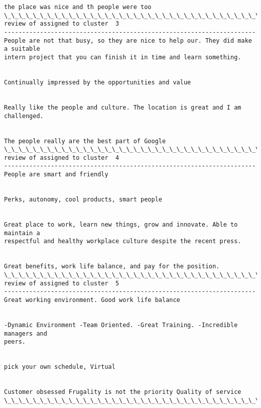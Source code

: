\documentclass[11pt]{article}
\begin{document}
\begin{Verbatim}[commandchars=\\\{\}]
the place was nice and th people were too
\_\_\_\_\_\_\_\_\_\_\_\_\_\_\_\_\_\_\_\_\_\_\_\_\_\_\_\_\_\_\_\_\_\_\_\_\_\_\_\_\_\_\_\_\_\_\_\_\_\_\_\_\_\_\_\_\_\_\_\_\_\_\_\_\_\_\_\_\_\_
review of assigned to cluster  3
----------------------------------------------------------------------
People are not that busy, so they are nice to help our. They did make a suitable
intern project that you can finish it in time and learn something.


Continually impressed by the opportunities and value


Really like the people and culture. The location is great and I am challenged.


The people really are the best part of Google
\_\_\_\_\_\_\_\_\_\_\_\_\_\_\_\_\_\_\_\_\_\_\_\_\_\_\_\_\_\_\_\_\_\_\_\_\_\_\_\_\_\_\_\_\_\_\_\_\_\_\_\_\_\_\_\_\_\_\_\_\_\_\_\_\_\_\_\_\_\_
review of assigned to cluster  4
----------------------------------------------------------------------
People are smart and friendly


Perks, autonomy, cool products, smart people


Great place to work, learn new things, grow and innovate. Able to maintain a
respectful and healthy workplace culture despite the recent press.


Great benefits, work life balance, and pay for the position.
\_\_\_\_\_\_\_\_\_\_\_\_\_\_\_\_\_\_\_\_\_\_\_\_\_\_\_\_\_\_\_\_\_\_\_\_\_\_\_\_\_\_\_\_\_\_\_\_\_\_\_\_\_\_\_\_\_\_\_\_\_\_\_\_\_\_\_\_\_\_
review of assigned to cluster  5
----------------------------------------------------------------------
Great working environment. Good work life balance


-Dynamic Environment -Team Oriented. -Great Training. -Incredible managers and
peers.


pick your own schedule, Virtual


Customer obsessed Frugality is not the priority Quality of service
\_\_\_\_\_\_\_\_\_\_\_\_\_\_\_\_\_\_\_\_\_\_\_\_\_\_\_\_\_\_\_\_\_\_\_\_\_\_\_\_\_\_\_\_\_\_\_\_\_\_\_\_\_\_\_\_\_\_\_\_\_\_\_\_\_\_\_\_\_\_
    \end{Verbatim}
\end{document}

